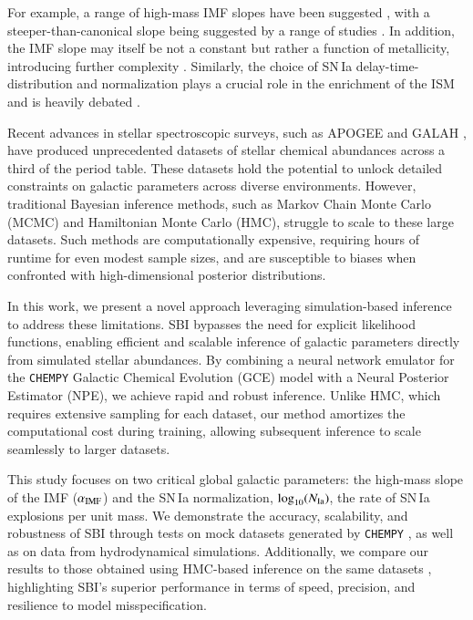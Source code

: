\documentclass{aa}
\begin{document}
For example, a range of high-mass IMF slopes have been suggested \citep[Tab.\,7]{2016ApJ...824...82C}, with a steeper-than-canonical slope being suggested by a range of studies \citep[e.g.][]{2015ApJ...806..198W,Rybizki2015,Chabrier2014}. In addition, the IMF slope may itself be not a constant but rather a function of metallicity, introducing further complexity \citep[e.g.][]{2019MNRAS.482..118G,Martin2019}. Similarly, the choice of SN\,Ia delay-time-distribution and normalization plays a crucial role in the enrichment of the ISM \citep[e.g.][]{Buck2021} and is heavily debated \citep{2010ApJ...722.1879M,2012MNRAS.426.3282M,2015ApJ...810..137J}.

Recent advances in stellar spectroscopic surveys, such as APOGEE \citep{apogee17} and GALAH \citep{Buder2021,Buder2024}, have produced unprecedented datasets of stellar chemical abundances across a third of the period table. These datasets hold the potential to unlock detailed constraints on galactic parameters across diverse environments. However, traditional Bayesian inference methods, such as Markov Chain Monte Carlo (MCMC) and Hamiltonian Monte Carlo (HMC), struggle to scale to these large datasets. Such methods are computationally expensive, requiring hours of runtime for even modest sample sizes, and are susceptible to biases when confronted with high-dimensional posterior distributions.

In this work, we present a novel approach leveraging simulation-based inference \citep[SBI, e.g.][]{Cranmer2020} to address these limitations. SBI bypasses the need for explicit likelihood functions, enabling efficient and scalable inference of galactic parameters directly from simulated stellar abundances. By combining a neural network emulator for the \texttt{CHEMPY} Galactic Chemical Evolution (GCE) model with a Neural Posterior Estimator (NPE), we achieve rapid and robust inference. Unlike HMC, which requires extensive sampling for each dataset, our method amortizes the computational cost during training, allowing subsequent inference to scale seamlessly to larger datasets.

This study focuses on two critical global galactic parameters: 
the high-mass slope of the \citet[Tab.\,1]{2003PASP..115..763C} IMF ($\alpha_{\rm IMF}$) and the SN\,Ia normalization, $\log_{10}(N_{\rm Ia})$, the rate of SN\,Ia explosions per unit mass. We demonstrate the accuracy, scalability, and robustness of SBI through tests on mock datasets generated by \texttt{CHEMPY} \citep{Rybizki_2017}, as well as on data from hydrodynamical simulations. Additionally, we compare our results to those obtained using HMC-based inference on the same datasets \citep[see][]{Philcox_2019}, highlighting SBI's superior performance in terms of speed, precision, and resilience to model misspecification.
\end{document}

